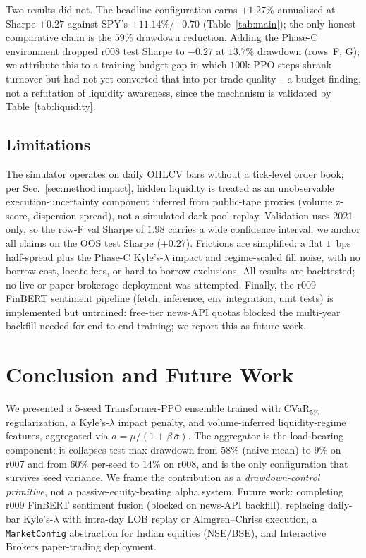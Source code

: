 \documentclass[conference]{IEEEtran}
\begin{document}
Two results did not. The headline configuration earns $+1.27\%$
annualized at Sharpe $+0.27$ against SPY's $+11.14\%$/$+0.70$
(Table~\ref{tab:main}); the only honest comparative claim is the
$59\%$ drawdown reduction. Adding the Phase-C environment dropped
r008 test Sharpe to $-0.27$ at $13.7\%$ drawdown (rows~F, G); we
attribute this to a training-budget gap in which $100$k PPO steps
shrank turnover but had not yet converted that into per-trade quality
-- a budget finding, not a refutation of liquidity awareness, since
the mechanism is validated by Table~\ref{tab:liquidity}.

\subsection{Limitations}
\label{sec:disc:limits}

The simulator operates on daily OHLCV bars without a tick-level order
book; per Sec.~\ref{sec:method:impact}, hidden liquidity is treated as
an unobservable execution-uncertainty component inferred from public-tape
proxies (volume z-score, dispersion spread), not a simulated dark-pool
replay. Validation uses 2021 only, so the row-F val Sharpe of $1.98$
carries a wide confidence interval; we anchor all claims on the OOS
test Sharpe ($+0.27$). Frictions are simplified: a flat $1$~bps
half-spread plus the Phase-C Kyle's-$\lambda$ impact and regime-scaled
fill noise, with no borrow cost, locate fees, or hard-to-borrow
exclusions. All results are backtested; no live or paper-brokerage
deployment was attempted. Finally, the r009 FinBERT sentiment pipeline
(fetch, inference, env integration, unit tests) is implemented but
untrained: free-tier news-API quotas blocked the multi-year backfill
needed for end-to-end training; we report this as future work.

\section{Conclusion and Future Work}
\label{sec:conclusion}
We presented a 5-seed Transformer-PPO ensemble trained with
CVaR$_{5\%}$ regularization, a Kyle's-$\lambda$ impact penalty, and
volume-inferred liquidity-regime features, aggregated via
$a = \mu / (1 + \beta\,\bar\sigma)$. The aggregator is the
load-bearing component: it collapses test max drawdown from $58\%$
(naive mean) to $9\%$ on r007 and from $60\%$ per-seed to $14\%$ on
r008, and is the only configuration that survives seed variance. We
frame the contribution as a \emph{drawdown-control primitive}, not a
passive-equity-beating alpha system. Future work: completing r009
FinBERT sentiment fusion (blocked on news-API backfill), replacing
daily-bar Kyle's-$\lambda$ with intra-day LOB replay or
Almgren--Chriss execution, a \texttt{MarketConfig} abstraction for
Indian equities (NSE/BSE), and Interactive Brokers paper-trading
deployment.

{\footnotesize


}
\end{document}
